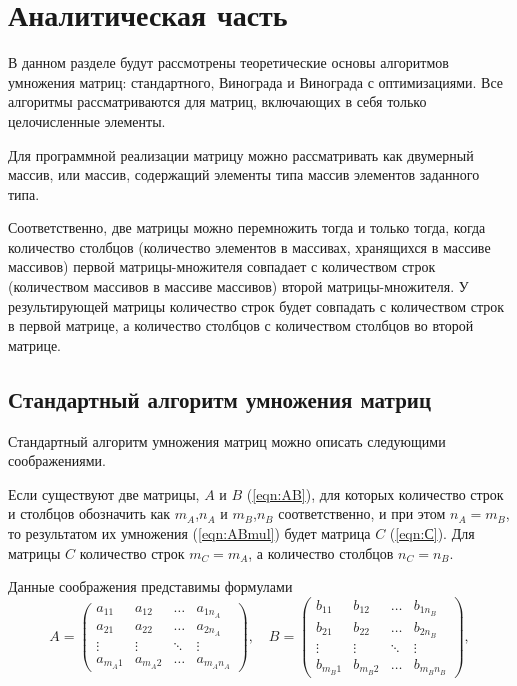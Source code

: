 \chapter{Аналитическая часть}
В данном разделе будут рассмотрены теоретические основы алгоритмов умножения матриц: стандартного, Винограда и Винограда с оптимизациями. Все алгоритмы рассматриваются для матриц, включающих в себя только целочисленные элементы.

Для программной реализации матрицу можно рассматривать как двумерный массив, или массив, содержащий элементы типа массив элементов заданного типа.

Соответственно, две матрицы можно перемножить тогда и только тогда, когда количество столбцов (количество элементов в массивах, хранящихся в массиве массивов) первой матрицы-множителя совпадает с количеством строк (количеством массивов в массиве массивов) второй матрицы-множителя. У результирующей матрицы количество строк будет совпадать с количеством строк в первой матрице, а количество столбцов с количеством столбцов во второй матрице.

\section{Стандартный алгоритм умножения матриц}
Стандартный алгоритм умножения матриц можно описать следующими соображениями.

Если существуют две матрицы, $A$ и $B$ (\ref{eqn:AB}), для которых количество строк и столбцов обозначить как $m_A$,$n_A$ и $m_B$,$n_B$ соответственно, и при этом $n_A=m_B$, то результатом их умножения (\ref{eqn:ABmul}) будет матрица $C$ (\ref{eqn:С}). Для матрицы $C$ количество строк $m_C = m_A$, а количество столбцов $n_C=n_B$.

Данные соображения представимы формулами
\begin{equation} \label{eqn:AB}
	A = \begin{pmatrix}
		a_{11} & a_{12} & \ldots & a_{1n_A}\\
		a_{21} & a_{22} & \ldots & a_{2n_A}\\
		\vdots & \vdots & \ddots & \vdots\\
		a_{m_A1} & a_{m_A2} & \ldots & a_{m_An_A}
	\end{pmatrix},
	\quad
	B = \begin{pmatrix}
		b_{11} & b_{12} & \ldots & b_{1n_B}\\
		b_{21} & b_{22} & \ldots & b_{2n_B}\\
		\vdots & \vdots & \ddots & \vdots\\
		b_{m_B1} & b_{m_B2} & \ldots & b_{m_Bn_B}
	\end{pmatrix},
\end{equation}

